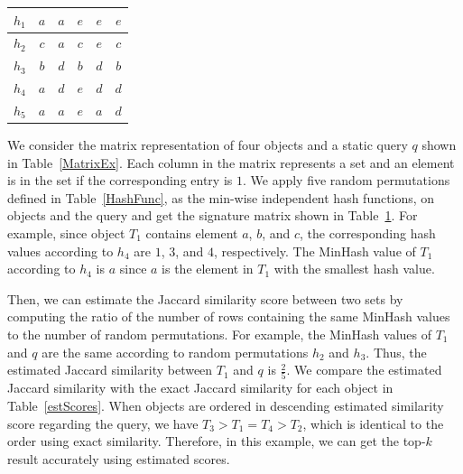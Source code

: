 \begin{table}[tb]
{{\begin{tabular}{|c||c|c|c|c|c|}
      $h_1$&$a$&$a$&$e$&$e$&$e$\\ \hline
      $h_2$&$c$&$a$&$c$&$e$&$c$\\ \hline
      $h_3$&$b$&$d$&$b$&$d$&$b$\\ \hline
      $h_4$&$a$&$d$&$e$&$d$&$d$\\ \hline
      $h_5$&$a$&$a$&$e$&$a$&$d$\\ \hline
    \end{tabular}}
\setlength{\tabcolsep}{0.5\tabcolsep}
\label{sigMEx1}}
\quad
{}
\end{table}

\begin{example}  \label{examinh} 
We consider the matrix representation of four objects and a static query $q$ shown in Table~\ref{MatrixEx}. Each column in the matrix represents a set and an element is in the set if the corresponding entry is $1$. We apply five random permutations defined in Table~\ref{HashFunc}, as the min-wise independent hash functions, on objects and the query and get the signature matrix shown in Table~\ref{sigMEx1}. For example, since object $T_1$ contains element $a$, $b$, and $c$, the corresponding hash values according to $h_4$ are $1$, $3$, and $4$, respectively. The MinHash value of $T_1$ according to $h_4$ is $a$ since $a$ is the element in $T_1$ with the smallest hash value.   

Then, we can estimate the Jaccard similarity score between two sets by computing the ratio of the number of rows containing the same MinHash values to the number of random permutations. For example, the MinHash values of $T_1$ and $q$ are the same according to random permutations $h_2$ and $h_3$. Thus, the estimated Jaccard similarity between $T_1$ and $q$ is $\frac{2}{5}$. We compare the estimated Jaccard similarity with the exact Jaccard similarity for each object in Table~\ref{estScores}. When objects are ordered in descending estimated similarity score regarding the query, we have $T_3 > T_1 = T_4 > T_2$, which is identical to the order using exact similarity. Therefore, in this example, we can get the top-$k$ result accurately using estimated scores.         
\end{example} 



